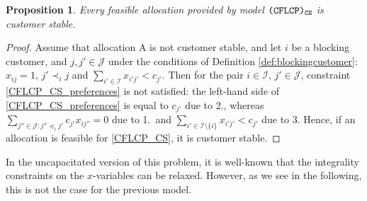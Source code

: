 \documentclass[preprint,11pt,authoryear]{elsarticle}
\def\J{\mathcal{J}}
\def\I{\mathcal{I}}
\newtheorem{prop}[theorem]{Proposition}
\begin{document}
\begin{prop}
Every feasible allocation provided by model ${\normalfont\texttt{(CFLCP)}_{\texttt{CS}}}$ is customer stable.
\end{prop}
\begin{proof}
Assume that allocation A is not customer stable, and let $i$ be a blocking customer, and $j, j'\in \J$ under the conditions of Definition \ref{def:blockingcustomer}: $x_{ij}=1$, $j' \prec_i j$ and $\sum_{i' \in \I} x_{i'j'} < c_{j'}$. Then for the pair $i\in\I$, $j'\in \J$, constraint \eqref{CFLCP_CS_preferences} is not satisfied: the left-hand side of \eqref{CFLCP_CS_preferences} is equal to $c_{j'}$ due to 2., whereas $\sum_{j''\in \J: j''\preceq_i j'} c_{j'}x_{ij''} = 0$ due to 1.\ and $\sum_{i'\in \I\setminus \{i\}} x_{i'j'} < c_{j'}$ due to 3. Hence, if an allocation is feasible for \eqref{CFLCP_CS}, it is customer stable.
\end{proof}


In the uncapacitated version of this problem, it is well-known that the integrality constraints on the $x$-variables can be relaxed. However, as we see in the following, this is not the case for the previous model.%
\end{document}
